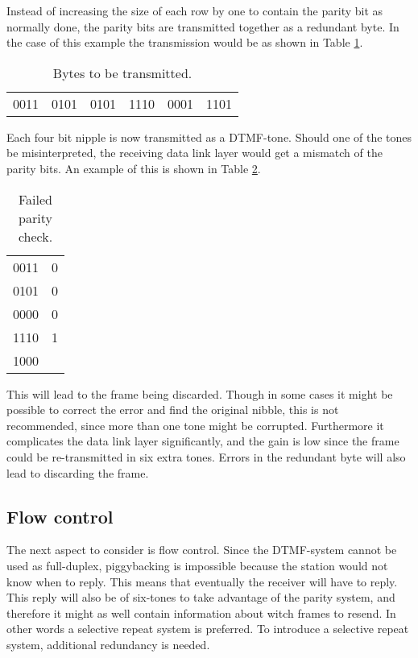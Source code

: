 Instead of increasing the size of each row by one to contain the parity bit as normally done, the parity bits are transmitted together as a redundant byte. In the case of this example the transmission would be as shown in Table \ref{tab:bytes_to_be_transmitted}.

\begin{table}[htb]
	\centering
	\begin{tabular}{c|c|c|c|c|c}
	0011 & 0101 & 0101 & 1110 & 0001 & 1101 \\
	\end{tabular}
	\caption{Bytes to be transmitted.}
	\label{tab:bytes_to_be_transmitted}
\end{table}

Each four bit nipple is now transmitted as a DTMF-tone. Should one of the tones
be misinterpreted, the receiving data link layer would get a mismatch of the
parity bits. An example of this is shown in Table \ref{tab:failed_parity_check}.

\begin{table}[htb]
	\centering
	\begin{tabular}{c|c}
	0011 & 0 \\
	0101 & 0 \\
	0000 & 0 \\
	1110 & 1 \\
	\hline
	1000 & \\
	\end{tabular}
	\caption{Failed parity check.}
	\label{tab:failed_parity_check}
\end{table}

This will lead to the frame being discarded. Though in some cases it might be
possible to correct the error and find the original nibble, this is not
recommended, since more than one tone might be corrupted. Furthermore it
complicates the data link layer significantly, and the gain is low since the
frame could be re-transmitted in six extra tones. Errors in the redundant byte
will also lead to discarding the frame.

\subsection{Flow control}
The next aspect to consider is flow control. Since the DTMF-system
cannot be used as full-duplex, piggybacking \cite[339]{KOM} is impossible
because the station would not know when to reply. This means that eventually the
receiver will have to reply. This reply will also be of six-tones to take advantage of the parity system, and therefore it might
as well contain information about witch frames to resend. In other words a
selective repeat system is preferred. To introduce a selective repeat system,
additional redundancy is needed.

